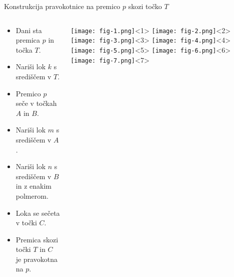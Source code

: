 \graphicspath{{C:/Users/Kanis/FMF/RP/racunalniski-praktikum/08-prosojnice/slike/}}
\begin{frame}{Konstrukcija pravokotnice na premico $p$ skozi točko $T$}
	\begin{columns}
		\begin{column}{0.55\textwidth}
			\begin{itemize}[<+->]
				\item Dani sta premica $p$ in točka $T$.
				\item Nariši lok $k$ s središčem v $T$.
				\item Premico $p$ seče v točkah $A$ in $B$.
				\item Nariši lok $m$ s središčem v $A$.
				\item Nariši lok $n$ s središčem v $B$ in z enakim polmerom.
				\item Loka se sečeta v točki $C$.
				\item Premica skozi točki $T$ in $C$ je pravokotna na $p$.
			\end{itemize}
		\end{column}
		\begin{column}{0.45\textwidth}
			\centering
			\texttt{[image: fig-1.png]}<1>
	        \texttt{[image: fig-2.png]}<2>
	        \texttt{[image: fig-3.png]}<3>
	        \texttt{[image: fig-4.png]}<4>
	        \texttt{[image: fig-5.png]}<5>
	        \texttt{[image: fig-6.png]}<6>
	        \texttt{[image: fig-7.png]}<7>
		\end{column}
	\end{columns}
\end{frame}

